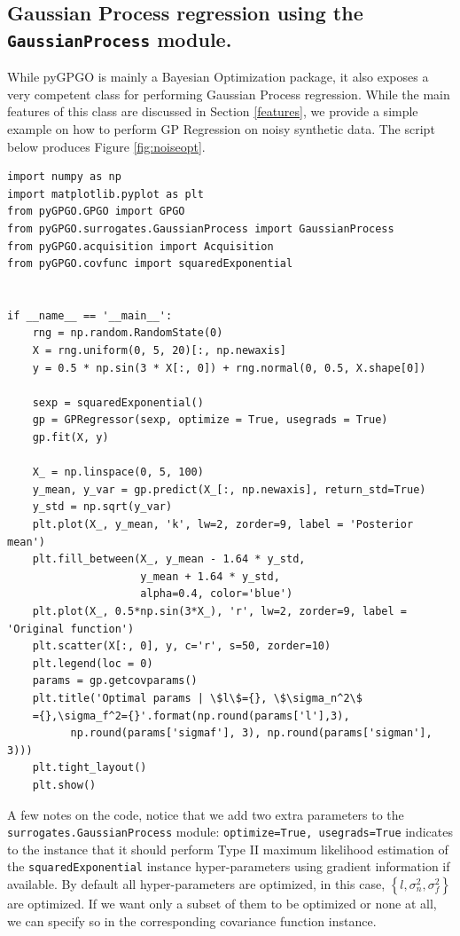 \documentclass[10pt,a4paper,twoside]{book}
\begin{document}
\subsection{Gaussian Process regression using the \texttt{GaussianProcess} module.}

While pyGPGO is mainly a Bayesian Optimization package, it also exposes a very competent class for performing Gaussian Process regression. While the main features of this class are discussed in Section \ref{features}, we provide a simple example on how to perform GP Regression on noisy synthetic data. The script below produces Figure \ref{fig:noiseopt}.

\begin{verbatim}
import numpy as np
import matplotlib.pyplot as plt
from pyGPGO.GPGO import GPGO
from pyGPGO.surrogates.GaussianProcess import GaussianProcess
from pyGPGO.acquisition import Acquisition
from pyGPGO.covfunc import squaredExponential


if __name__ == '__main__':
    rng = np.random.RandomState(0)
    X = rng.uniform(0, 5, 20)[:, np.newaxis]
    y = 0.5 * np.sin(3 * X[:, 0]) + rng.normal(0, 0.5, X.shape[0])

    sexp = squaredExponential()
    gp = GPRegressor(sexp, optimize = True, usegrads = True)
    gp.fit(X, y)

    X_ = np.linspace(0, 5, 100)
    y_mean, y_var = gp.predict(X_[:, np.newaxis], return_std=True)
    y_std = np.sqrt(y_var)
    plt.plot(X_, y_mean, 'k', lw=2, zorder=9, label = 'Posterior mean')
    plt.fill_between(X_, y_mean - 1.64 * y_std,
                     y_mean + 1.64 * y_std,
                     alpha=0.4, color='blue')
    plt.plot(X_, 0.5*np.sin(3*X_), 'r', lw=2, zorder=9, label = 'Original function')
    plt.scatter(X[:, 0], y, c='r', s=50, zorder=10)
    plt.legend(loc = 0)
    params = gp.getcovparams()
    plt.title('Optimal params | \$l\$={}, \$\sigma_n^2\$
    ={},\sigma_f^2={}'.format(np.round(params['l'],3),
    	  np.round(params['sigmaf'], 3), np.round(params['sigman'], 3)))
    plt.tight_layout()
    plt.show()
\end{verbatim}


A few notes on the code, notice that we add two extra parameters to the \texttt{surrogates.GaussianProcess} module: \texttt{optimize=True, usegrads=True} indicates to the instance that it should perform Type II maximum likelihood estimation of the \texttt{squaredExponential} instance hyper-parameters using gradient information if available. By default all hyper-parameters are optimized, in this case, $\left\lbrace l, \sigma_n^2, \sigma_f^2 \right\rbrace$ are optimized. If we want only a subset of them to be optimized or none at all, we can specify so in the corresponding covariance function instance. 
\end{document}
